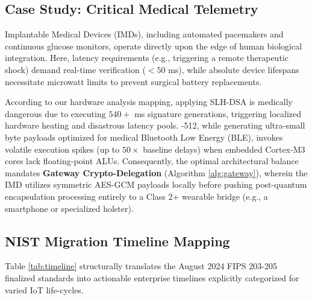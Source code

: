 \subsection{Case Study: Critical Medical Telemetry}

Implantable Medical Devices (IMDs), including automated pacemakers and continuous glucose monitors, operate directly upon the edge of human biological integration. Here, latency requirements (e.g., triggering a remote therapeutic shock) demand real-time verification ($<50$ ms), while absolute device lifespans necessitate microwatt limits to prevent surgical battery replacements.

According to our hardware analysis mapping, applying SLH-DSA is medically dangerous due to executing $540+$ ms signature generations, triggering localized hardware heating and disastrous latency pools. \falcon{}-512, while generating ultra-small byte payloads optimized for medical Bluetooth Low Energy (BLE), invokes volatile execution spikes (up to $50\times$ baseline delays) when embedded Cortex-M3 cores lack floating-point ALUs. Consequently, the optimal architectural balance mandates \textbf{Gateway Crypto-Delegation} (Algorithm \ref{alg:gateway}), wherein the IMD utilizes symmetric AES-GCM payloads locally before pushing post-quantum encapsulation processing entirely to a Class 2+ wearable bridge (e.g., a smartphone or specialized holster). 

\subsection{NIST Migration Timeline Mapping}

Table \ref{tab:timeline} structurally translates the August 2024 FIPS 203-205 finalized standards into actionable enterprise timelines explicitly categorized for varied IoT life-cycles.

\begin{table}[htbp]
\caption{Strategic PQC Migration Windows for IoT Architectures}
\label{tab:timeline}
\centering
{}
\end{table}
